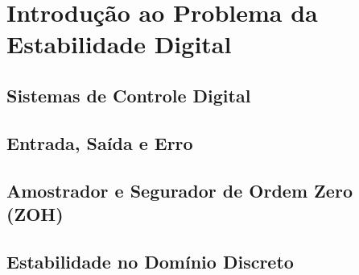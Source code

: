 \chapter{Introdução ao Problema da Estabilidade Digital}
\label{cap:introducao}

\section{Sistemas de Controle Digital}


\section{Entrada, Saída e Erro}


\section{Amostrador e Segurador de Ordem Zero (ZOH)}


\section{Estabilidade no Domínio Discreto}

